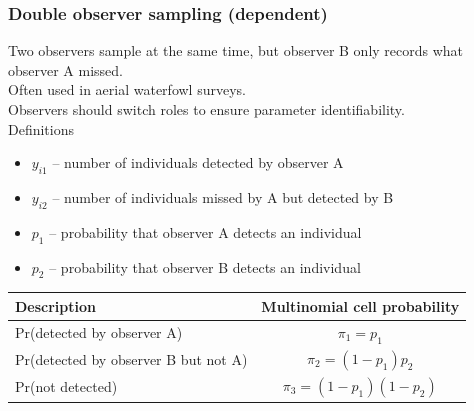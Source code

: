 \documentclass[color=usenames,dvipsnames]{beamer}\usepackage[]{graphicx}\usepackage[]{xcolor}
\begin{document}
\begin{frame}
  \frametitle{Double observer sampling (dependent)}
  \small
  Two observers sample at the same time, but observer B only records
  what observer A missed. \\
  \pause
  \vfill
  Often used in aerial waterfowl surveys. \\
  \pause
  \vfill
  Observers should switch roles to ensure parameter identifiability. \\
  \pause
  \vfill
  Definitions
  \begin{itemize}
    \setlength\itemsep{1pt}
    \item $y_{i1}$ -- number of individuals detected by observer A
    \item $y_{i2}$ -- number of individuals missed by A but
      detected by B
    \item $p_1$ -- probability that observer A detects an individual 
    \item $p_2$ -- probability that observer B detects an individual 
  \end{itemize}
  \pause \vfill
  \footnotesize
  \begin{tabular}{lc}
    \hline
    \centering
    Description & Multinomial cell probability \\
    \hline
    Pr(detected by observer A) & $\pi_1 = p_1$ \\
    Pr(detected by observer B but not A) & $\pi_2 = (1-p_1)p_2$ \\
    Pr(not detected) & $\pi_3 = (1-p_1)(1-p_2)$ \\
    \hline
  \end{tabular}
\end{frame}
\end{document}
